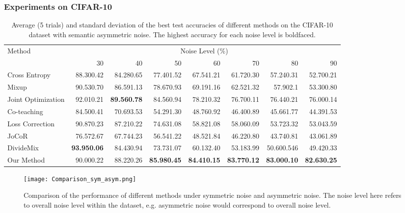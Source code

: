 \documentclass[conference]{IEEEtran}
\begin{document}
\begin{algorithm}[H]
\subsubsection{Experiments on CIFAR-10}
\begin{table*}[!tb]
\caption{Average (5 trials) and standard deviation of the best test accuracies  of different methods on the CIFAR-10 dataset with semantic asymmetric noise. The highest accuracy for each noise level is boldfaced.}
\label{cifar_asyn}
\centering
\begin{tabular}{lrrrrrrr}
\toprule
\multirow{2}{*}{Method} & \multicolumn{7}{c}{Noise Level (\%)} \\ \cmidrule{2-8} 
  & 30  & 40  & 50  & 60  & 70  & 80  & 90  \\ \midrule
Cross Entropy   & 88.300.42 & 84.280.65 & 77.401.52 & 67.541.21 & 61.720.30 & 57.240.31 & 52.700.21   \\ \midrule
Mixup\cite{zhang2017mixup}  & 90.530.70 & 86.591.13 & 78.670.93 & 69.191.16 & 62.521.32 & 57.902.1 & 53.300.80    \\ \midrule
Joint Optimization\cite{tanaka2018joint}  & 92.010.21 & \textbf{89.560.78} & 84.560.94 & 78.210.32 & 76.700.11 & 76.440.21 & 76.000.14  \\ \midrule
Co-teaching\cite{han2018co}  & 84.500.41 &	70.693.53 &	54.291.30 &	48.760.92 &	46.400.89 &	45.661.77 &	44.391.53 \\\midrule
Loss Correction\cite{arazo2019unsupervised}  & 90.870.23 & 87.210.22 & 74.631.08 & 58.821.08 & 58.060.09 & 53.723.32 & 53.043.59    \\ \midrule
JoCoR\cite{wei2020combating}  &76.572.67 &	67.744.23 	& 56.541.22 &	48.521.84 &	46.220.80 & 43.740.81 & 43.061.89 \\ \midrule
DivideMix\cite{li2020dividemix}  & \textbf{93.950.06} & 84.430.94 & 73.731.07 & 60.132.40 & 53.183.99 & 50.600.546 & 49.420.33 \\ \midrule
Our Method &  90.000.22 & 88.220.26 & \textbf{85.980.45} & \textbf{84.410.15} & \textbf{83.770.12} & \textbf{83.000.10} & \textbf{82.630.25} \\ 
 \bottomrule
\end{tabular}
\end{table*}


\begin{figure*}[tb]
\centering
\texttt{[image: Comparison\_sym\_asym.png]}
\caption{Comparison of the performance of different methods under symmetric noise and asymmetric noise. The noise level here refers to overall noise level within the dataset, e.g.  asymmetric noise would correspond to  overall noise level. }
\label{cifar_fig}
\end{figure*}






\end{algorithm}
\end{document}
